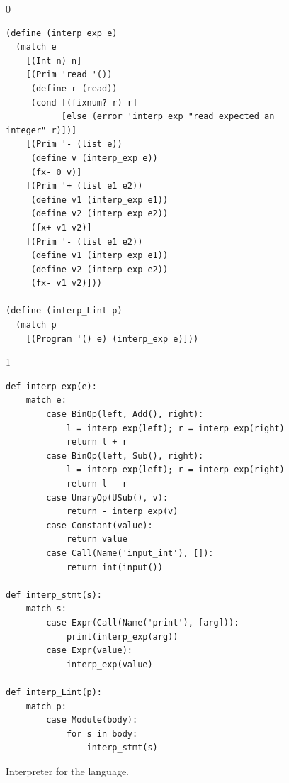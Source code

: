 \documentclass[7x10]{TimesAPriori_MIT}%
\def\racketEd{0}
\def\pythonEd{1}
\def\edition{1}
\newcommand{\pythonColor}[0]{}
\numberwithin{theorem}{chapter}
\numberwithin{definition}{chapter}
\numberwithin{equation}{chapter}
\begin{document}
\begin{figure}[tp]
\begin{tcolorbox}[colback=white]
{\if\edition\racketEd
\begin{lstlisting}
(define (interp_exp e)
  (match e
    [(Int n) n]
    [(Prim 'read '())
     (define r (read))
     (cond [(fixnum? r) r]
           [else (error 'interp_exp "read expected an integer" r)])]
    [(Prim '- (list e))
     (define v (interp_exp e))
     (fx- 0 v)]
    [(Prim '+ (list e1 e2))
     (define v1 (interp_exp e1))
     (define v2 (interp_exp e2))
     (fx+ v1 v2)]
    [(Prim '- (list e1 e2))
     (define v1 (interp_exp e1))
     (define v2 (interp_exp e2))
     (fx- v1 v2)]))

(define (interp_Lint p)
  (match p
    [(Program '() e) (interp_exp e)]))
\end{lstlisting}
\fi}
{\if\edition\pythonEd\pythonColor
\begin{lstlisting}
def interp_exp(e):
    match e:
        case BinOp(left, Add(), right):
            l = interp_exp(left); r = interp_exp(right)
            return l + r
        case BinOp(left, Sub(), right):
            l = interp_exp(left); r = interp_exp(right)
            return l - r
        case UnaryOp(USub(), v):
            return - interp_exp(v)
        case Constant(value):
            return value
        case Call(Name('input_int'), []):
            return int(input())            

def interp_stmt(s):
    match s:
        case Expr(Call(Name('print'), [arg])):
            print(interp_exp(arg))
        case Expr(value):
            interp_exp(value)

def interp_Lint(p):
    match p:
        case Module(body):
            for s in body:
                interp_stmt(s)
\end{lstlisting}
\fi}
\end{tcolorbox}

\caption{Interpreter for the \LangInt{} language.}
\label{fig:interp_Lint}
\end{figure}
\end{document}
